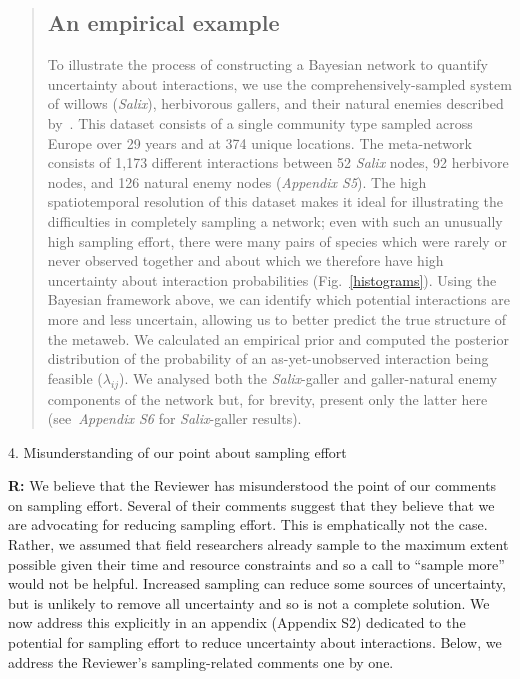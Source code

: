 \documentclass[12pt]{letter}
\begin{document}
		\begin{quotation}
		  \subsection*{An empirical example}

		      To illustrate the process of constructing a Bayesian network to quantify uncertainty about interactions, we use the comprehensively-sampled system of willows (\emph{Salix}), herbivorous gallers, and their natural enemies described by~\citet{Kopelke2017}. This dataset consists of a single community type sampled across Europe over 29 years and at 374 unique locations. The meta-network consists of 1,173 different interactions between 52 \emph{Salix} nodes, 92 herbivore nodes, and 126 natural enemy nodes (\emph{Appendix S5}). 
		      The high spatiotemporal resolution of this dataset makes it ideal for illustrating the difficulties in completely sampling a network; even with such an unusually high sampling effort, there were many pairs of species which were rarely or never observed together and about which we therefore have high uncertainty about interaction probabilities (Fig.~\ref{histograms}). Using the Bayesian framework above, we can identify which potential interactions are more and less uncertain, allowing us to better predict the true structure of the metaweb. 
		      We calculated an empirical prior and computed the posterior distribution of the probability of an as-yet-unobserved interaction being feasible ($\lambda_{ij}$). We analysed both the \emph{Salix}-galler and galler-natural enemy components of the network but, for brevity, present only the latter here (see~\emph{Appendix S6} for \emph{Salix}-galler results).
		\end{quotation}


	4. Misunderstanding of our point about sampling effort 


		\textbf{R:} We believe that the Reviewer has  misunderstood the point of our comments on sampling effort. Several of their comments suggest that they believe that we are advocating for reducing sampling effort. This is emphatically not the case. Rather, we assumed that field researchers already sample to the maximum extent possible given their time and resource constraints and so a call to ``sample more'' would not be helpful. Increased sampling can reduce some sources of uncertainty, but is unlikely to remove all uncertainty and so is not a complete solution. We now address this explicitly in an appendix (Appendix S2)  dedicated to the potential for sampling effort to reduce uncertainty about interactions. Below, we address the Reviewer's sampling-related comments one by one.
\end{document}

